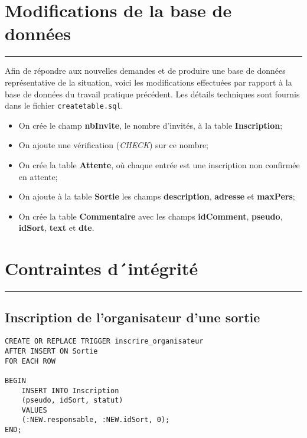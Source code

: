 \documentclass[11pt,letterpaper]{article}
\begin{document}
\section{Modifications de la base de données}
\hrule
\vspace{1em}
Afin de répondre aux nouvelles demandes et de produire une base de données représentative de la situation, 
voici les modifications effectuées par rapport à la base de données du travail pratique précédent. 
Les détails techniques sont fournis dans le fichier \texttt{createtable.sql}.
\renewcommand{\labelitemi}{$\bullet$}
\begin{itemize}
  \item On crée le champ \textbf{nbInvite}, le nombre d’invités, à la table \textbf{Inscription};
  \item On ajoute une vérification (\textit{CHECK}) sur ce nombre;
  \item On crée la table \textbf{Attente}, où chaque entrée est une inscription non confirmée en attente;
  \item On ajoute à la table \textbf{Sortie} les champs \textbf{description}, \textbf{adresse} et \textbf{maxPers};
  \item On crée la table \textbf{Commentaire} avec les champs \textbf{idComment}, \textbf{pseudo}, \textbf{idSort}, \textbf{text} et \textbf{dte}.
\end{itemize}


\hfill
\section{Contraintes d´intégrité}
\hrule
\vspace{1em}

\subsection{Inscription de l’organisateur d’une sortie}
\begin{lstlisting}[style=sql, label={lst:p3}]
CREATE OR REPLACE TRIGGER inscrire_organisateur
AFTER INSERT ON Sortie
FOR EACH ROW

BEGIN
	INSERT INTO Inscription
	(pseudo, idSort, statut)
	VALUES
	(:NEW.responsable, :NEW.idSort, 0);
END;
\end{lstlisting}
\end{document}
